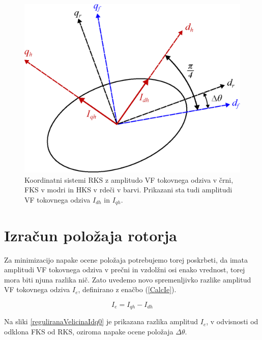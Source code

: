 \documentclass[a4paper,twoside,openright,12pt,slovene]{book}
\begin{document}
\begin{figure}[!htbp]
    \centering
    \includegraphics[width=0.7\columnwidth]{Slike/Inkscape/koordinatniSistem.eps}
    \caption{\label{koordinatniSistem} Koordinatni sistemi RKS z amplitudo VF tokovnega odziva v črni, FKS v modri in HKS v rdeči v barvi. Prikazani sta tudi amplitudi VF tokovnega odziva $I_{dh}$ in
    $I_{qh}$.}
\end{figure}

\newpage
\section{Izračun položaja rotorja}

Za minimizacijo napake ocene položaja potrebujemo torej poskrbeti, da imata amplitudi VF tokovnega odziva v prečni in vzdolžni osi enako vrednost, torej mora biti njuna razlika nič. Zato uvedemo novo
spremenljivko razlike amplitud VF tokovnega odziva $I_e$, definirano z enačbo (\ref{CalcIe}).

\begin{equation} \label{CalcIe}
    I_e = I_{qh} - I_{dh}
\end{equation}

Na sliki \ref{reguliranaVelicinaIdq0} je prikazana razlika amplitud $I_e$, v odvisnosti od odklona FKS od RKS, oziroma napake ocene položaja $\Delta\theta$. 
\end{document}
